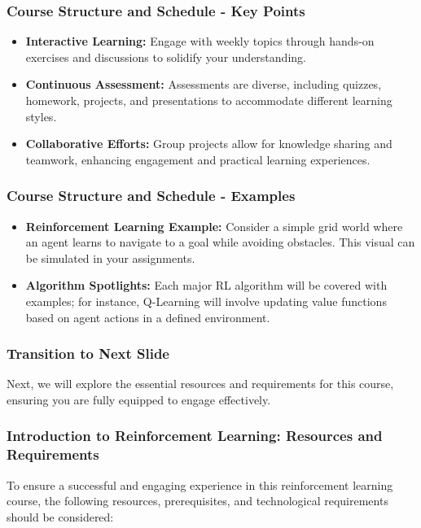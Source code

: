 \documentclass[aspectratio=169]{beamer}
\begin{document}
\begin{frame}[fragile]
    \frametitle{Course Structure and Schedule - Key Points}
    \begin{itemize}
        \item \textbf{Interactive Learning:} Engage with weekly topics through hands-on exercises and discussions to solidify your understanding.
        \item \textbf{Continuous Assessment:} Assessments are diverse, including quizzes, homework, projects, and presentations to accommodate different learning styles.
        \item \textbf{Collaborative Efforts:} Group projects allow for knowledge sharing and teamwork, enhancing engagement and practical learning experiences.
    \end{itemize}
\end{frame}

\begin{frame}[fragile]
    \frametitle{Course Structure and Schedule - Examples}
    \begin{itemize}
        \item \textbf{Reinforcement Learning Example:} 
        Consider a simple grid world where an agent learns to navigate to a goal while avoiding obstacles. This visual can be simulated in your assignments.
        \item \textbf{Algorithm Spotlights:}
        Each major RL algorithm will be covered with examples; for instance, Q-Learning will involve updating value functions based on agent actions in a defined environment.
    \end{itemize}
\end{frame}

\begin{frame}[fragile]
    \frametitle{Transition to Next Slide}
    Next, we will explore the essential resources and requirements for this course, ensuring you are fully equipped to engage effectively.
\end{frame}

\begin{frame}[fragile]
    \frametitle{Introduction to Reinforcement Learning: Resources and Requirements}
    To ensure a successful and engaging experience in this reinforcement learning course, the following resources, prerequisites, and technological requirements should be considered:
\end{frame}
\end{document}
